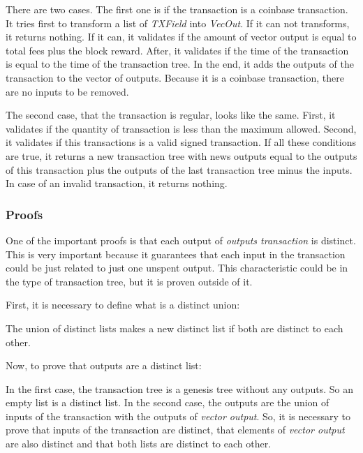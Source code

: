 
There are two cases.
The first one is if the transaction is a coinbase transaction.
It tries first to transform a list of \emph{TXField} into \emph{VecOut}.
If it can not transforms, it returns nothing.
If it can, it validates if the amount of vector output is equal to total fees plus the block reward.
After, it validates if the time of the transaction is equal to the time of the transaction tree.
In the end, it adds the outputs of the transaction to the vector of outputs.
Because it is a coinbase transaction, there are no inputs to be removed.


The second case, that the transaction is regular, looks like the same.
First, it validates if the quantity of transaction is less than the maximum allowed.
Second, it validates if this transactions is a valid signed transaction.
If all these conditions are true, it returns a new transaction tree
with news outputs equal to the outputs of this transaction plus the outputs of the last transaction tree
minus the inputs.
In case of an invalid transaction, it returns nothing.

\subsubsection{Proofs}

One of the important proofs is that each output of \emph{outputs transaction} is distinct.
This is very important because it guarantees that each input in the transaction could be
just related to just one unspent output.
This characteristic could be in the type of transaction tree,
but it is proven outside of it.

First, it is necessary to define what is a distinct union:


The union of distinct lists makes a new distinct list if both are distinct to each other.

Now, to prove that outputs are a distinct list:


In the first case, the transaction tree is a genesis tree without any outputs.
So an empty list is a distinct list.
In the second case, the outputs are the union of inputs of the transaction with the outputs
of \emph{vector output}.
So, it is necessary to prove that inputs of the transaction are distinct,
that elements of \emph{vector output} are also distinct and that both lists are distinct to each other.

